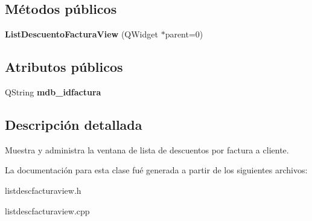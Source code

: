 \subsection*{M\'{e}todos p\'{u}blicos}
\begin{CompactItemize}
\item 
{\bf List\-Descuento\-Factura\-View} (QWidget $\ast$parent=0)\label{classListDescuentoFacturaView_a0}

\end{CompactItemize}
\subsection*{Atributos p\'{u}blicos}
\begin{CompactItemize}
\item 
QString {\bf mdb\_\-idfactura}\label{classListDescuentoFacturaView_o0}

\end{CompactItemize}


\subsection{Descripci\'{o}n detallada}
Muestra y administra la ventana de lista de descuentos por factura a cliente. 



La documentaci\'{o}n para esta clase fu\'{e} generada a partir de los siguientes archivos:\begin{CompactItemize}
\item 
listdescfacturaview.h\item 
listdescfacturaview.cpp\end{CompactItemize}
